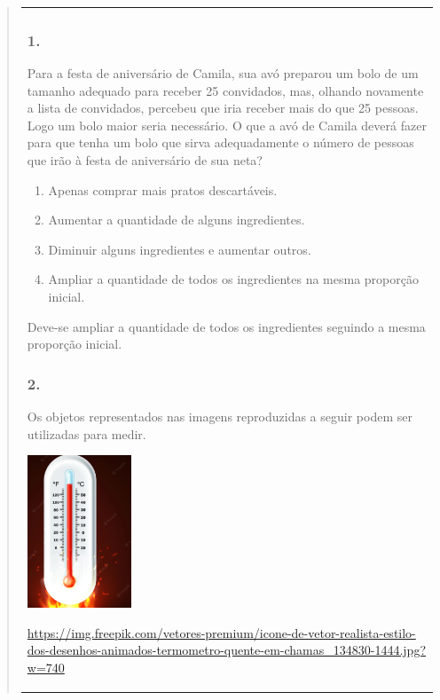 \begin{enumerate}
\begin{escolha}
\begin{enumerate}
\begin{itemize}
\begin{itemize}
\begin{escolha}
\begin{quote}
\begin{escolha}
{\begin{longtable}[]{@{}l@{}}
\begin{itemize}
\subsubsection{1.}\label{section-117}

Para a festa de aniversário de Camila, sua avó preparou um bolo de um
tamanho adequado para receber 25 convidados, mas, olhando novamente a
lista de convidados, percebeu que iria receber mais do que 25 pessoas. Logo um bolo maior seria necessário.
O que a avó de Camila deverá fazer para que tenha um bolo que sirva
adequadamente o número de pessoas que irão à festa de aniversário de sua
neta?

\begin{enumerate}
\def\labelenumi{\alph{enumi})}
\item
  Apenas comprar mais pratos descartáveis.
\item
  Aumentar a quantidade de alguns ingredientes.
\item
  Diminuir alguns ingredientes e aumentar outros.
\item
  Ampliar a quantidade de todos os ingredientes na mesma proporção
  inicial.
\end{enumerate}

Deve-se ampliar a quantidade de todos os ingredientes seguindo a mesma
proporção inicial.

\subsubsection{2. }\label{section-118}

Os objetos representados nas imagens reproduzidas a seguir podem ser utilizadas para medir.

\includegraphics[width=1.22500in,height=1.79354in]{media/image128.png}

\url{https://img.freepik.com/vetores-premium/icone-de-vetor-realista-estilo-dos-desenhos-animados-termometro-quente-em-chamas_134830-1444.jpg?w=740}


\end{itemize}
\end{longtable}}
\end{escolha}
\end{quote}
\end{escolha}
\end{itemize}
\end{itemize}
\end{enumerate}
\end{escolha}
\end{enumerate}
